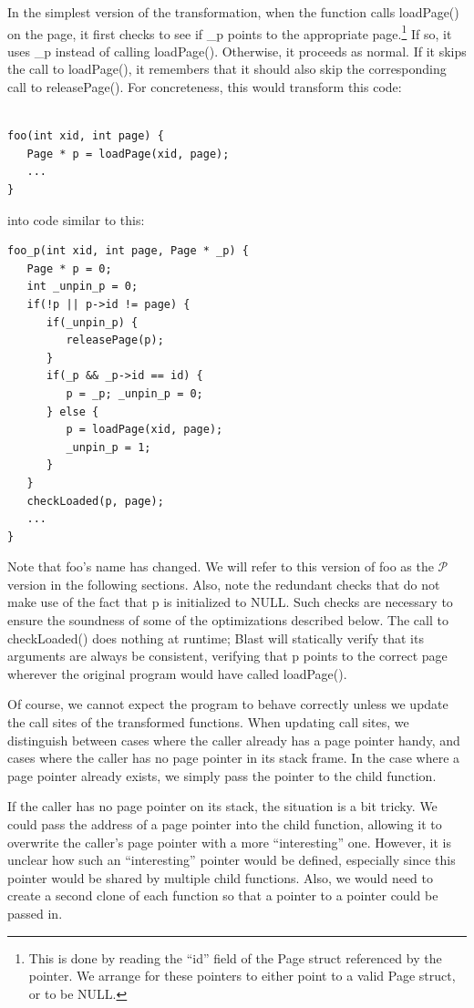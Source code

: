 \documentclass[10pt,letterpaper,twocolumn,english]{article}
\newcommand{\pin}{loadPage()\xspace}
\newcommand{\unpin}{releasePage()\xspace}
\newcommand{\checkpage}{checkLoaded()\xspace}
\newcommand{\PP}{\_p\xspace}
\newcommand{\fP}{{$\mathcal P$}\xspace}
\begin{document}
In the simplest version of the transformation, when the function calls
\pin on the page, it first checks to see if \PP points to the
appropriate page.\footnote{This is done by reading the ``id'' field of
the Page struct referenced by the pointer.  We arrange for these
pointers to either point to a valid Page struct, or to be NULL.}  If
so, it uses \PP instead of calling \pin.  Otherwise, it proceeds as
normal.  If it skips the call to \pin, it remembers that it should
also skip the corresponding call to \unpin.  For concreteness, this would transform this code: 
\begin{verbatim} 

foo(int xid, int page) {
   Page * p = loadPage(xid, page);
   ...
}
\end{verbatim}
into code similar to this:
\begin{verbatim}
foo_p(int xid, int page, Page * _p) { 
   Page * p = 0;
   int _unpin_p = 0;
   if(!p || p->id != page) { 
      if(_unpin_p) { 
         releasePage(p);
      } 
      if(_p && _p->id == id) {
         p = _p; _unpin_p = 0;
      } else { 
         p = loadPage(xid, page);
         _unpin_p = 1;
      }
   }
   checkLoaded(p, page);
   ...
}
\end{verbatim}
Note that foo's name has changed.  We will refer to this version of
foo as the \fP version in the following sections.  Also, note the
redundant checks that do not make use of the fact that p is
initialized to NULL.  Such checks are necessary to ensure the
soundness of some of the optimizations described below.  The call to
\checkpage does nothing at runtime;  Blast will 
statically verify that its arguments are always be consistent, verifying 
that p points to the correct page wherever the original program 
would have called \pin.

Of course, we cannot expect the program to behave correctly unless we
update the call sites of the transformed functions.  When updating
call sites, we distinguish between cases where the caller already has
a page pointer handy, and cases where the caller has no page pointer
in its stack frame.  In the case where a page pointer already exists,
we simply pass the pointer to the child function.

If the caller has no page pointer on its stack, the situation is a bit
tricky.  We could pass the address of a page pointer into the child
function, allowing it to overwrite the caller's page pointer with a
more ``interesting'' one.  However, it is unclear how such an
``interesting'' pointer would be defined, especially since this
pointer would be shared by multiple child functions.  Also, we would need
to create a second clone of each function so that a pointer to a
pointer could be passed in.  
\end{document}
